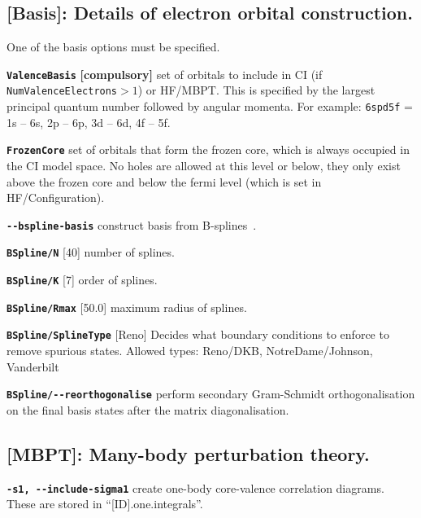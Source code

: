 \documentclass[a4paper,11pt]{article}
\newcommand{\option}[1]{\smallskip\noindent\textbf{\texttt{#1}}}
\begin{document}
\subsection{[Basis]: Details of electron orbital construction.}
One of the basis options must be specified.

\option{ValenceBasis} \textbf{[compulsory]} set of orbitals to include in CI (if \mbox{\texttt{NumValenceElectrons}$>1$}) or HF/MBPT. This is specified by the largest principal quantum number followed by angular momenta. For example:
\texttt{6spd5f} = 1s -- 6s, 2p -- 6p, 3d -- 6d, 4f -- 5f.

\option{FrozenCore} set of orbitals that form the frozen core, which is always occupied in the CI model space. No holes are allowed at this level or below, they only exist above the frozen core and below the fermi level (which is set in HF/Configuration).

\option{-{}-bspline-basis} construct basis from B-splines~\cite{johnson88pra}.

\option{BSpline/N} [40] number of splines.

\option{BSpline/K} [7]  order of splines.

\option{BSpline/Rmax} [50.0] maximum radius of splines.

\option{BSpline/SplineType} [Reno] Decides what boundary conditions to enforce to remove spurious states. Allowed types: Reno/DKB, NotreDame/Johnson, Vanderbilt

\option{BSpline/-{}-reorthogonalise} perform secondary Gram-Schmidt orthogonalisation on the final basis states after the matrix diagonalisation.


\subsection{[MBPT]: Many-body perturbation theory.}

\option{-s1, -{}-include-sigma1} create one-body core-valence correlation diagrams. These are stored in ``[ID].one.integrals''.
\end{document}
